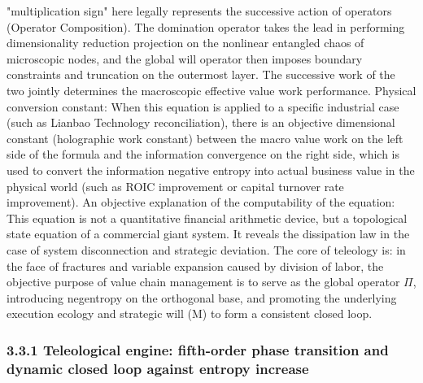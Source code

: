 \documentclass[11pt,a4paper]{article}
\begin{document}
"multiplication sign" here legally represents the successive action of operators (Operator Composition). The domination operator takes the lead in performing dimensionality reduction projection on the nonlinear entangled chaos of microscopic nodes, and the global will operator then imposes boundary constraints and truncation on the outermost layer. The successive work of the two jointly determines the macroscopic effective value work performance. Physical conversion constant: When this equation is applied to a specific industrial case (such as Lianbao Technology reconciliation), there is an objective dimensional constant (holographic work constant) between the macro value work on the left side of the formula and the information convergence on the right side, which is used to convert the information negative entropy into actual business value in the physical world (such as ROIC improvement or capital turnover rate improvement). An objective explanation of the computability of the equation: This equation is not a quantitative financial arithmetic device, but a topological state equation of a commercial giant system. It reveals the dissipation law in the case of system disconnection and strategic deviation. The core of teleology is: in the face of fractures and variable expansion caused by division of labor, the objective purpose of value chain management is to serve as the global operator $\Pi$, introducing negentropy on the orthogonal base, and promoting the underlying execution ecology and strategic will (M) to form a consistent closed loop.


\subsubsection*{3.3.1 Teleological engine: fifth-order phase transition and dynamic closed loop against entropy increase}
\end{document}
